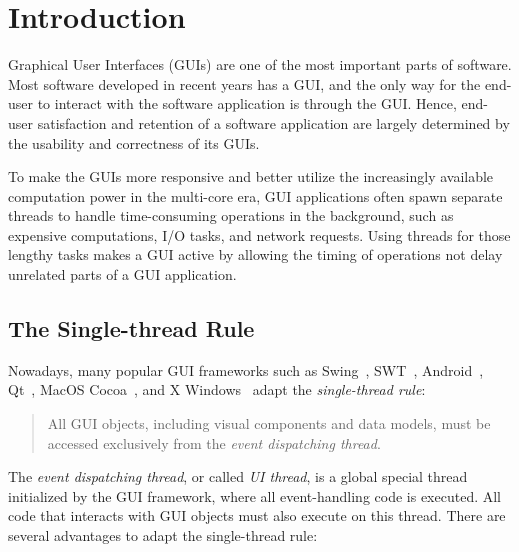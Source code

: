 \section{Introduction}

Graphical User Interfaces (GUIs) are one of the most important parts of
software. Most software developed in recent years has a GUI, and the only
way for the end-user to interact with the software application is through
the GUI. Hence, end-user satisfaction and retention of a software application
 are largely determined by the usability and correctness of
its GUIs.

To make the GUIs more responsive and better utilize the increasingly available
computation power in the multi-core era, GUI applications often spawn separate
threads to handle time-consuming operations in the background, such as expensive
computations, I/O tasks, and network requests. Using threads for those lengthy tasks
makes a GUI active by allowing the timing of operations not delay unrelated parts of a 
GUI application.



\subsection{The Single-thread Rule}

Nowadays, many popular GUI frameworks such as Swing~\cite{swing}, SWT~\cite{swt}, Android~\cite{android},
Qt~\cite{qt}, MacOS Cocoa~\cite{macos}, and X Windows~\cite{xwindow} 
adapt the \textit{single-thread rule}:

\vspace{-2mm}

\begin{quote}
All GUI objects, including visual components and data models, must be
 accessed exclusively from the \textit{event dispatching thread}.
\end{quote}

\vspace{-2mm}

The \textit{event dispatching thread}, or called \textit{UI thread}, is a global special
thread initialized by the GUI framework, where all event-handling code
is executed. All code that interacts with GUI objects must also
execute on this thread.  There are several advantages to adapt the single-thread rule:

